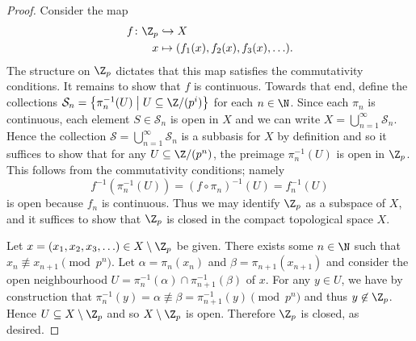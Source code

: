 \documentclass[10pt]{amsart}
\begin{document}
\begin{thm}
\begin{proof}
    Consider the map     
    \begin{align*}
      f \colon \Z_p &\hookrightarrow X\\
      x &\mapsto (f_1(x), f_2(x), f_3(x), \ldots).
    \end{align*}
    The structure on $\Z_p$ dictates that this map satisfies the commutativity conditions.
    It remains to show that $f$ is continuous.
    Towards that end, define the collections $\mathcal{S}_n = \left\{\pi_n^{-1}(U) \;\middle\vert\; U \subseteq \Z/(p^i) \right\}$ for each $n \in \N$.
    Since each $\pi_n$ is continuous, each element $S \in \mathcal{S}_n$ is open in $X$ and we can write $X = \bigcup_{n=1}^\infty \mathcal{S}_n$.
    Hence the collection $\mathcal{S} = \bigcup_{n=1}^\infty \mathcal{S}_n$ is a subbasis for $X$ by definition and so it suffices to show that for any $U \subseteq \Z/(p^n)$, the preimage $\pi_n^{-1}(U)$ is open in $\Z_p$.
    This follows from the commutativity conditions; namely 
    $$f^{-1}(\pi_n^{-1}(U)) = (f \circ \pi_n)^{-1}(U) = f_n^{-1}(U)$$
    is open because $f_n$ is continuous.
    Thus we may identify $\Z_p$ as a subspace of $X$, and it suffices to show that $\Z_p$ is closed in the compact topological space $X$.
    
    Let $x = (x_1, x_2, x_3, \ldots) \in X \setminus \Z_p$ be given.
    There exists some $n \in \N$ such that $x_n \not \equiv x_{n+1} \pmod{p^n}$.
    Let $\alpha = \pi_n(x_n)$ and $\beta = \pi_{n+1}(x_{n+1})$ and consider the open neighbourhood $U = \pi_n^{-1}(\alpha) \cap \pi_{n+1}^{-1}(\beta)$ of $x$.
    For any $y \in U$, we have by construction that $\pi_n^{-1}(y) = \alpha \not \equiv \beta = \pi_{n+1}^{-1}(y) \pmod{p^n}$ and thus $y \not \in \Z_p$.
    Hence $U \subseteq X \setminus \Z_p$ and so $X \setminus \Z_p$ is open.
    Therefore $\Z_p$ is closed, as desired.
    
  \end{proof}
\end{thm}
\end{document}
